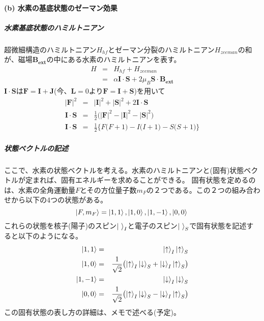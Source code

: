 \documentclass[11pt,a4paper]{jsarticle}
\begin{document}
\paragraph{(b) 水素の基底状態のゼーマン効果\\}
\subparagraph{水素基底状態のハミルトニアン}
超微細構造のハミルトニアン$H_{hf}$とゼーマン分裂のハミルトニアン$H_{zeeman}$の和が、磁場$\bm{B_{ext}}$の中にある水素のハミルトニアンを表す。
\begin{eqnarray}
  H &=& H_{hf} + H_{zeeman}\\
  &=& \alpha \bm{I} \cdot \bm{S} + 2 \mu_B \bm{S} \cdot \bm{B_{ext}}
\end{eqnarray}
$\bm{I} \cdot \bm{S}$は$\bm{F} = \bm{I}+\bm{J}$(今、$\bm{L}=0$より$\bm{F}=\bm{I}+\bm{S}$)を用いて
\begin{eqnarray}
  |\bm{F}|^2 &=& |\bm{I}|^2 + |\bm{S}|^2 + 2\bm{I} \cdot \bm{S}\\
  \bm{I} \cdot \bm{S} &=& \frac{1}{2} \bigl( |\bm{F}|^2 - |\bm{I}|^2 - |\bm{S}|^2 \bigr)\\
  \bm{I} \cdot \bm{S} &=& \frac{1}{2} \bigl\{ F\bigl(F+1\bigr) - I\bigl(I+1\bigr) - S\bigl(S+1\bigr) \bigr\}
\end{eqnarray}

\subparagraph{状態ベクトルの記述}
ここで、水素の状態ベクトルを考える。水素のハミルトニアンと(固有)状態ベクトルが定まれば、固有エネルギーを求めることができる。
固有状態を定めるのは、水素の全角運動量$F$とその方位量子数$m_F$の２つである。この２つの組み合わせから以下の4つの状態がある。
\begin{equation}
  \ket{F,m_F} = \ket{1,1}, \ket{1,0}, \ket{1,-1}, \ket{0,0}\\
\end{equation}
これらの状態を核子(陽子)のスピン$\ket{~}_I$と電子のスピン$\ket{~}_S$で固有状態を記述すると以下のようになる。
\begin{eqnarray}
  \ket{1,1} &=& \ket{\uparrow}_I \ket{\uparrow}_S \\
  \ket{1,0} &=& \frac{1}{\sqrt{2}}\bigl( \ket{\uparrow}_I \ket{\downarrow}_S + \ket{\downarrow}_I \ket{\uparrow}_S \bigr) \\
  \ket{1,-1} &=& \ket{\downarrow}_I \ket{\downarrow}_S \\
  \ket{0,0} &=& \frac{1}{\sqrt{2}}\bigl( \ket{\uparrow}_I \ket{\downarrow}_S - \ket{\downarrow}_I \ket{\uparrow}_S \bigr)
\end{eqnarray}
この固有状態の表し方の詳細は、メモで述べる(予定)。
\end{document}
